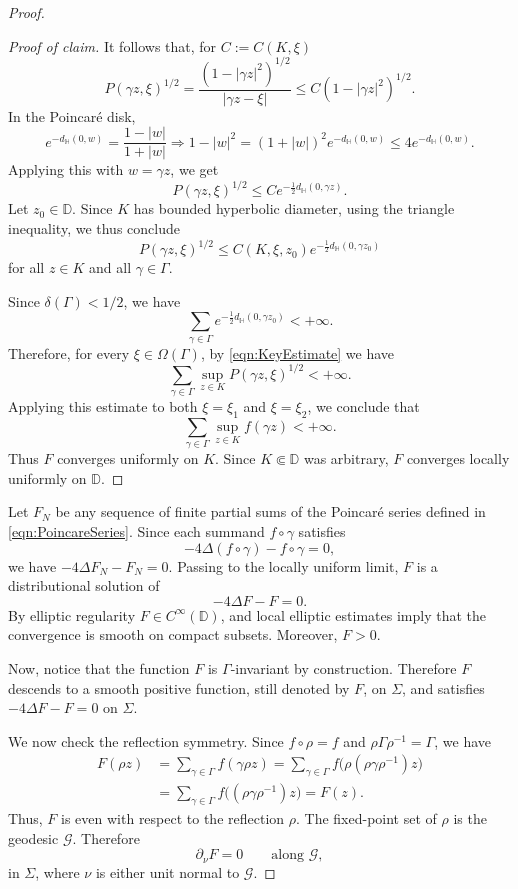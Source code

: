 \documentclass[12pt,a4paper,reqno]{amsart}
\theoremstyle{definition}
\renewcommand{\leq}{\leqslant}
\begin{document}
{\begin{proof}
\begin{proof}[Proof of claim]
It follows that, for $C:=C(K,\xi)$
\[
P(\gamma z,\xi)^{1/2}
=
\frac{(1-|\gamma z|^2)^{1/2}}{|\gamma z-\xi|}
\leq
C(1-|\gamma z|^2)^{1/2}.
\]
In the Poincaré disk,
\[
e^{-d_{\mathbb H}(0,w)}
=
\frac{1-|w|}{1+|w|} \Rightarrow
1-|w|^2
=
(1+|w|)^2 e^{-d_{\mathbb H}(0,w)}
\leq
4e^{-d_{\mathbb H}(0,w)}.
\]
Applying this with $w=\gamma z$, we get
\[
P(\gamma z,\xi)^{1/2}
\leq
C e^{-\frac12 d_{\mathbb H}(0,\gamma z)}.
\]
Let $z_0\in \mathbb D$. Since $K$ has bounded hyperbolic diameter, using the triangle inequality, we thus conclude
\begin{equation}\label{eqn:KeyEstimate}
P(\gamma z,\xi)^{1/2}
\leq
C(K,\xi,z_0) e^{-\frac12 d_{\mathbb H}(0,\gamma z_0)}
\end{equation}
for all $z\in K$ and all $\gamma\in\Gamma$.



Since $\delta(\Gamma)<1/2$, we have
\[
\sum_{\gamma\in\Gamma}
e^{-\frac12 d_{\mathbb H}(0,\gamma z_0)}
<+\infty.
\]
Therefore, for every $\xi\in\Omega(\Gamma)$, by \eqref{eqn:KeyEstimate} we have
\[
\sum_{\gamma\in\Gamma}
\sup_{z\in K}P(\gamma z,\xi)^{1/2}
<+\infty.
\]
Applying this estimate to both $\xi=\xi_1$ and $\xi=\xi_2$, we conclude
that
\[
\sum_{\gamma\in\Gamma}
\sup_{z\in K} f(\gamma z)
<+\infty.
\]
Thus $F$ converges uniformly on $K$. Since $K\Subset\mathbb D$ was
arbitrary, $F$ converges locally uniformly on $\mathbb D$.
\end{proof}

Let $F_N$ be any sequence of finite partial sums of the Poincaré series defined in \eqref{eqn:PoincareSeries}. Since each summand
$f\circ\gamma$ satisfies
\[
-4\Delta(f\circ\gamma)-f\circ\gamma=0,
\]
we have $
-4\Delta F_N-F_N=0$.
Passing to the locally uniform limit, $F$ is a distributional solution of
\begin{equation}\label{eqn:LaplacianF}
-4\Delta F-F=0.
\end{equation}
By elliptic regularity $
F\in C^\infty(\mathbb D)$,
and local elliptic estimates imply that the convergence is smooth on compact
subsets. Moreover, $
F>0$.

Now, notice that the function $F$ is $\Gamma$-invariant by construction. 
Therefore $F$ descends to a smooth positive function, still denoted by $F$, on $\Sigma$,
and satisfies
$-4\Delta F-F=0$ on $\Sigma$.

We now check the reflection symmetry. Since $f\circ\rho=f$ and
$\rho\Gamma\rho^{-1}=\Gamma$, we have
\[
\begin{aligned}
F(\rho z) &=
\sum_{\gamma\in\Gamma} f(\gamma\rho z) =
\sum_{\gamma\in\Gamma} f\bigl(\rho(\rho\gamma\rho^{-1})z\bigr) \\
&=
\sum_{\gamma\in\Gamma} f\bigl((\rho\gamma\rho^{-1})z\bigr) =
F(z).
\end{aligned}
\]
Thus, $F$ is even with respect to the reflection $\rho$. The fixed-point set
of $\rho$ is the geodesic $\mathcal G$. Therefore
\begin{equation}\label{eqn:PartialnuF}
\partial_\nu F=0
\qquad
\text{along } \mathcal G,
\end{equation}
in $\Sigma$, where $\nu$ is either unit normal to $\mathcal G$.


\end{proof}}
\end{document}
